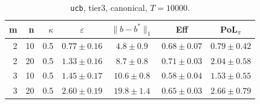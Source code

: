 \begin{table}[htbp]
\centering
\scriptsize
\caption{\texttt{ucb}, tier3, canonical, $T=10000$.}
\label{tab:tier3_long_ucb}
\begin{tabular}{@{}rrrcccc@{}}
\toprule
m & n & $\kappa$ & $\varepsilon$ & $\|b-b^*\|_1$ & Eff & PoL$_\pi$ \\
\midrule
2 & 10 & 0.5 & $0.77 \pm 0.16$ & $4.8 \pm 0.9$ & $0.68 \pm 0.07$ & $0.79 \pm 0.42$ \\
2 & 20 & 0.5 & $1.33 \pm 0.16$ & $8.7 \pm 0.8$ & $0.71 \pm 0.03$ & $2.04 \pm 0.58$ \\
\midrule
3 & 10 & 0.5 & $1.45 \pm 0.17$ & $10.6 \pm 0.8$ & $0.58 \pm 0.04$ & $1.53 \pm 0.55$ \\
3 & 20 & 0.5 & $2.60 \pm 0.19$ & $19.8 \pm 1.4$ & $0.65 \pm 0.03$ & $2.66 \pm 0.79$ \\
\bottomrule
\end{tabular}
\end{table}
